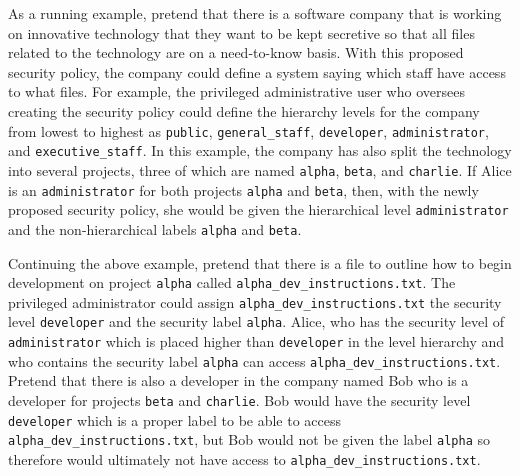 As a running example, pretend that
there is a software company that is working on innovative technology that they want
to be kept secretive so that all files related to the technology are on a need-to-know basis. 
With this proposed security policy, the company could define a system saying which staff have
access to what files. For example, the privileged administrative user who oversees creating the security policy 
could define the hierarchy levels for the company from lowest to highest as
\texttt{public}, \texttt{general\_staff}, \texttt{developer}, \texttt{administrator}, and \texttt{executive\_staff}.
In this example, the company has also split the technology into several projects, 
three of which are named \texttt{alpha}, \texttt{beta}, and \texttt{charlie}. If Alice is an \texttt{administrator} for
both projects \texttt{alpha} and \texttt{beta}, then, with the newly proposed security policy,
she would be given the hierarchical level \texttt{administrator} and the non-hierarchical labels
\texttt{alpha} and \texttt{beta}. 

Continuing the above example, pretend that there is a file to outline how to begin development on project \texttt{alpha} called
\texttt{alpha}\texttt{\_dev}\texttt{\_instructions.txt}. The privileged administrator could assign \texttt{alpha}\texttt{\_dev}\texttt{\_instructions.txt} 
the security level \texttt{developer} and the security label \texttt{alpha}. Alice, who has the security level of \texttt{administrator}
which is placed higher than \texttt{developer} in the level hierarchy 
and who contains the security label \texttt{alpha} can access \texttt{alpha}\texttt{\_dev}\texttt{\_instructions.txt}.
Pretend that there is also a developer in the company named Bob who is a developer for projects \texttt{beta} and \texttt{charlie}. Bob would
have the security level \texttt{developer} which is a proper label to be able to access \texttt{alpha}\texttt{\_dev}\texttt{\_instructions.txt}, but Bob would not
be given the label \texttt{alpha} so therefore would ultimately not have access to \texttt{alpha}\texttt{\_dev}\texttt{\_instructions.txt}.

